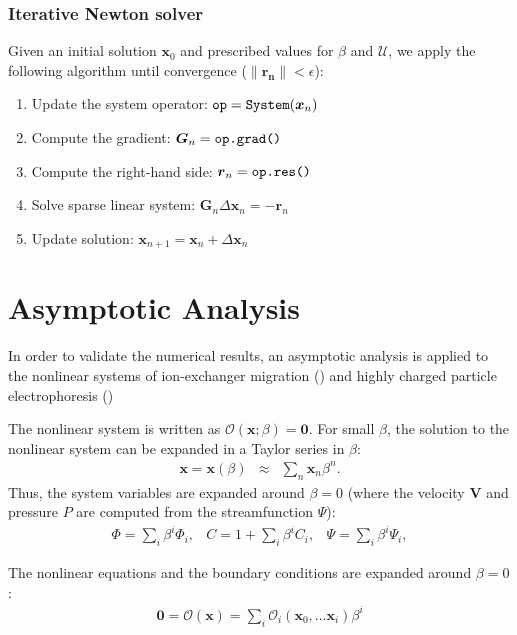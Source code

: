 \documentclass[10pt]{ijnam}
\newcommand\eps \epsilon
\newcommand\bV{\boldsymbol{V}}
\newcommand\bx{\boldsymbol{x}}
\newcommand\bzero{\boldsymbol{0}}
\newcommand\cO{\mathcal{O}}
\newcommand\cU{\mathscr{U}}
\begin{document}
\subsubsection{Iterative Newton solver}
Given an initial solution $\bx_0$ and prescribed values for $\beta$ and $\cU$, 
we apply the following algorithm 
until convergence ($\|\boldsymbol{r_n}\| < \eps$):
\begin{enumerate}
\item Update the system operator: $\verb|op| = \verb|System|(\bx_{n})$
\item Compute the gradient: $\boldsymbol{G}_n = \verb|op.grad()|$
\item Compute the right-hand side: $\boldsymbol{r}_n = \verb|op.res()|$
\item Solve sparse linear system: $\boldsymbol{G}_n \Delta \bx_n = -\boldsymbol{r}_n$
\item Update solution: $\bx_{n+1} = \bx_{n} + \Delta \bx_{n}$
\end{enumerate}

\section{Asymptotic Analysis} \label{sec:asymp}
In order to validate the numerical results, an asymptotic analysis is applied 
to the nonlinear systems of ion-exchanger migration (\cite{yariv2010migration,zeyde2012report})
and highly charged particle electrophoresis (\cite{schnitzer2012surface, schnitzer2012cubic})

The nonlinear system is written as $\cO(\bx;\beta) = \bzero$.
For small $\beta$, the solution to the nonlinear system can be expanded in a Taylor series in $\beta$:
\begin{eqnarray*}
\bx = \bx(\beta) &\approx& \sum_n \bx_n \beta^n.
\end{eqnarray*}
Thus, the system variables are expanded around $\beta = 0$
(where the velocity $\bV$ and pressure $P$ are computed from the streamfunction $\Psi$):
\begin{eqnarray*}
\varPhi = \sum_i \beta^i \varPhi_i, &
C = 1 + \sum_i \beta^i C_i, &
\Psi = \sum_i \beta^i \Psi_i,
\end{eqnarray*}

The nonlinear equations and the boundary conditions 
are expanded around $\beta = 0$:
\begin{eqnarray*}
\bzero = \cO(\bx) = \sum_i \cO_i(\bx_0, \ldots \bx_i) \beta^i
\end{eqnarray*}
\end{document}
